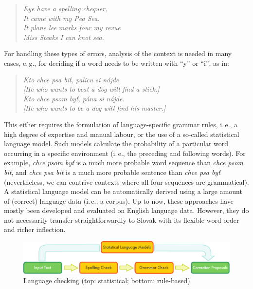 \begin{multicols}{2}
\begin{verse}
\emph{%
Eye have a spelling chequer,\\
It came with my Pea Sea.\\
It plane lee marks four my revue\\
Miss Steaks I can knot sea.
}
\end{verse}

For handling these types of errors, analysis of the context is needed in many cases, e.\,g., for deciding if a word needs to be written with “y” or “i”, as in:

\begin{verse}
\emph{%
Kto chce psa biť, palicu si nájde.\\
{[}He who wants to beat a dog will find a stick.{]}\\
\smallskip
Kto chce psom byť, pána si nájde.\\
{[}He who wants to be a dog will find his master.{]}
}
\end{verse}

This either requires the formulation of language-specific grammar rules, i.\,e., a high degree of expertise and manual labour, or the use of a so-called statistical language model.  Such models calculate the probability of a particular word occurring in a specific environment (i.\,e., the preceding and following words). For example, \emph{chce psom byť} is a much more probable word sequence than \emph{chce psom biť}, and \emph{chce psa biť} is a much more probable sentence than \emph{chce psa byť} (nevertheless, we can contrive contexts where all four sequences are grammatical). A statistical language model can be automatically derived using a large amount of (correct) language data (i.\,e., a corpus). Up to now, these approaches have mostly been developed and evaluated on English language data. However, they do not necessarily transfer straightforwardly to Slovak with its flexible word order and richer inflection. 

\begin{figure}[htb]
  \center
  \includegraphics[width=\textwidth]{../_media/english/language_checking}
  \caption{Language checking (top: statistical; bottom: rule-based)}
  \label{fig:langcheckingaarch_en}
\end{figure}


\end{multicols}

